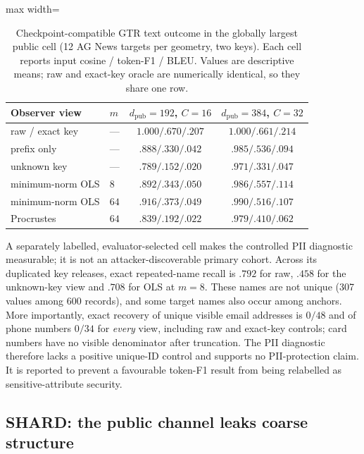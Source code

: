\begin{table}[H]
\begin{singlespace}
\centering
\caption{Checkpoint-compatible GTR text outcome in the globally largest
public cell (12 AG News targets per geometry, two keys). Each cell reports
input cosine / token-F1 / BLEU. Values are descriptive means; raw and
exact-key oracle are numerically identical, so they share one row.}
\label{tab:shard-text}
\small
\begin{adjustbox}{max width=\linewidth}
\begin{tabular}{@{}llcc@{}}
\toprule
Observer view & $m$ & $d_{\mathrm{pub}}{=}192$, $C{=}16$ & $d_{\mathrm{pub}}{=}384$, $C{=}32$ \\ \midrule
raw / exact key & --- & $1.000/.670/.207$ & $1.000/.661/.214$ \\
prefix only & --- & $.888/.330/.042$ & $.985/.536/.094$ \\
unknown key & --- & $.789/.152/.020$ & $.971/.331/.047$ \\
minimum-norm OLS & $8$ & $.892/.343/.050$ & $.986/.557/.114$ \\
minimum-norm OLS & $64$ & $.916/.373/.049$ & $.990/.516/.107$ \\
Procrustes & $64$ & $.839/.192/.022$ & $.979/.410/.062$ \\
\bottomrule
\end{tabular}
\end{adjustbox}
\end{singlespace}
\end{table}

A separately labelled, evaluator-selected cell makes the controlled PII
diagnostic measurable; it is not an attacker-discoverable primary cohort.
Across its duplicated key releases, exact repeated-name recall is $.792$ for
raw, $.458$ for the unknown-key view and $.708$ for OLS at $m=8$. These names
are not unique (307 values among 600 records), and some target names also occur
among anchors. More importantly, exact recovery of unique visible email
addresses is $0/48$ and of phone numbers $0/34$ for \emph{every} view,
including raw and exact-key controls; card numbers have no visible denominator
after truncation. The PII diagnostic therefore lacks a positive unique-ID
control and supports no PII-protection claim. It is reported to prevent a
favourable token-F1 result from being relabelled as sensitive-attribute
security.

\FloatBarrier
\subsection{SHARD: the public channel leaks coarse structure}\label{ssec:shard-leak}

